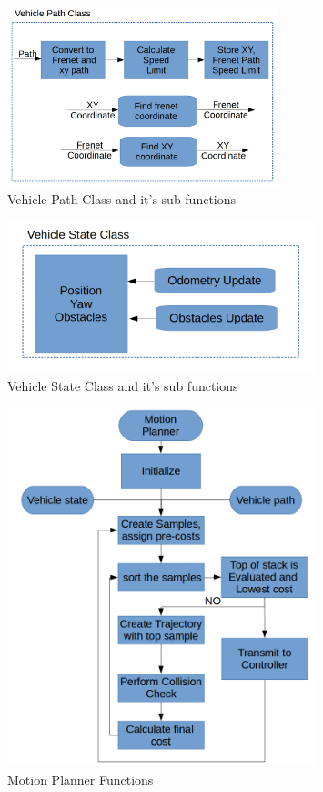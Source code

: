 \begin{figure}
	\centering
	\includegraphics[width=0.7\textwidth]{Images/implementation/vehicle_path.png}
	\caption{Vehicle Path Class and it's sub functions}
	\label{vehicle_path_class}
\end{figure}

\begin{figure}
	\centering
	\includegraphics[width=0.8\textwidth]{Images/implementation/vehicle_state.png}
	\caption{Vehicle State Class and it's sub functions}
	\label{vehicle_state_class}
\end{figure}

\begin{figure}
	\centering
	\includegraphics[width=0.8\textwidth]{Images/implementation/motion_planner.png}
	\caption{Motion Planner Functions}
	\label{motion_planner_class}
\end{figure}






